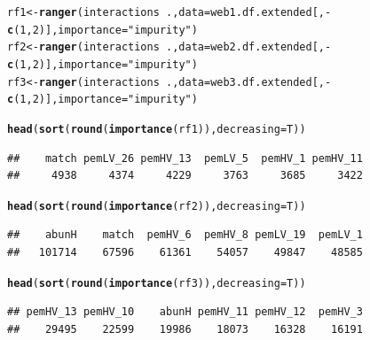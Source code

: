 \documentclass[a4paper, 11pt]{article}\usepackage[]{graphicx}\usepackage[]{color}
\makeatletter
\newcommand{\hlnum}[1]{\textcolor[rgb]{0.686,0.059,0.569}{#1}}%
\newcommand{\hlstr}[1]{\textcolor[rgb]{0.192,0.494,0.8}{#1}}%
\newcommand{\hlopt}[1]{\textcolor[rgb]{0,0,0}{#1}}%
\newcommand{\hlstd}[1]{\textcolor[rgb]{0.345,0.345,0.345}{#1}}%
\newcommand{\hlkwb}[1]{\textcolor[rgb]{0.69,0.353,0.396}{#1}}%
\newcommand{\hlkwc}[1]{\textcolor[rgb]{0.333,0.667,0.333}{#1}}%
\newcommand{\hlkwd}[1]{\textcolor[rgb]{0.737,0.353,0.396}{\textbf{#1}}}%
\newenvironment{kframe}{%
 \def\at@end@of@kframe{}%
 \ifinner\ifhmode%
  \def\at@end@of@kframe{\end{minipage}}%
  \begin{minipage}{\columnwidth}%
 \fi\fi%
 \def\FrameCommand##1{\hskip\@totalleftmargin \hskip-\fboxsep
 \colorbox{shadecolor}{##1}\hskip-\fboxsep
     \hskip-\linewidth \hskip-\@totalleftmargin \hskip\columnwidth}%
 \MakeFramed {\advance\hsize-\width
   \@totalleftmargin\z@ \linewidth\hsize
   \@setminipage}}%
 {\par\unskip\endMakeFramed%
 \at@end@of@kframe}
\newenvironment{knitrout}{}{} %
\makeatother
\begin{document}
\begin{knitrout}\small
{}\color{fgcolor}\begin{kframe}
\begin{alltt}
\hlstd{rf1} \hlkwb{<-} \hlkwd{ranger}\hlstd{(interactions} \hlopt{~} \hlstd{.,} \hlkwc{data}\hlstd{=web1.df.extended[,} \hlopt{-}\hlkwd{c}\hlstd{(}\hlnum{1}\hlstd{,} \hlnum{2}\hlstd{)],} \hlkwc{importance}\hlstd{=}\hlstr{"impurity"}\hlstd{)}
\hlstd{rf2} \hlkwb{<-} \hlkwd{ranger}\hlstd{(interactions} \hlopt{~} \hlstd{.,} \hlkwc{data}\hlstd{=web2.df.extended[,} \hlopt{-}\hlkwd{c}\hlstd{(}\hlnum{1}\hlstd{,} \hlnum{2}\hlstd{)],} \hlkwc{importance}\hlstd{=}\hlstr{"impurity"}\hlstd{)}
\hlstd{rf3} \hlkwb{<-} \hlkwd{ranger}\hlstd{(interactions} \hlopt{~} \hlstd{.,} \hlkwc{data}\hlstd{=web3.df.extended[,} \hlopt{-}\hlkwd{c}\hlstd{(}\hlnum{1}\hlstd{,} \hlnum{2}\hlstd{)],} \hlkwc{importance}\hlstd{=}\hlstr{"impurity"}\hlstd{)}
\end{alltt}
\end{kframe}
\end{knitrout}
\begin{knitrout}\small
{}\color{fgcolor}\begin{kframe}
\begin{alltt}
\hlkwd{head}\hlstd{(}\hlkwd{sort}\hlstd{(}\hlkwd{round}\hlstd{(}\hlkwd{importance}\hlstd{(rf1)),} \hlkwc{decreasing}\hlstd{=T))}
\end{alltt}
\begin{verbatim}
##    match pemLV_26 pemHV_13  pemLV_5  pemHV_1 pemHV_11 
##     4938     4374     4229     3763     3685     3422
\end{verbatim}
\begin{alltt}
\hlkwd{head}\hlstd{(}\hlkwd{sort}\hlstd{(}\hlkwd{round}\hlstd{(}\hlkwd{importance}\hlstd{(rf2)),} \hlkwc{decreasing}\hlstd{=T))}
\end{alltt}
\begin{verbatim}
##    abunH    match  pemHV_6  pemHV_8 pemLV_19  pemLV_1 
##   101714    67596    61361    54057    49847    48585
\end{verbatim}
\begin{alltt}
\hlkwd{head}\hlstd{(}\hlkwd{sort}\hlstd{(}\hlkwd{round}\hlstd{(}\hlkwd{importance}\hlstd{(rf3)),} \hlkwc{decreasing}\hlstd{=T))}
\end{alltt}
\begin{verbatim}
## pemHV_13 pemHV_10    abunH pemHV_11 pemHV_12  pemHV_3 
##    29495    22599    19986    18073    16328    16191
\end{verbatim}
\end{kframe}
\end{knitrout}
\end{document}
